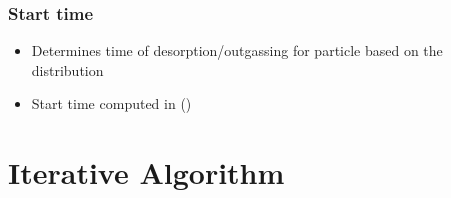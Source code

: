 \subsubsection{Start time}
\begin{itemize}[noitemsep,topsep=0pt, partopsep=0pt]
\item Determines time of desorption/outgassing for particle based on the distribution
\item Start time computed in  ()
\end{itemize}


\section{Iterative Algorithm}

